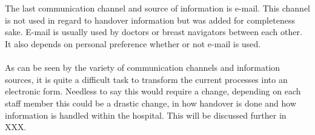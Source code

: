 \\ \\
The last communication channel and source of information is e-mail. This channel is not used in regard to handover information but was added for completeness sake. E-mail is usually used by doctors or breast navigators between each other. It also depends on personal preference whether or not e-mail is used. 
\\ \\
As can be seen by the variety of communication channels and information sources, it is quite a difficult task to transform the current processes into an electronic form. Needless to say this would require a change, depending on each staff member this could be a drastic change, in how handover is done and how information is handled within the hospital. This will be discussed further in XXX.

